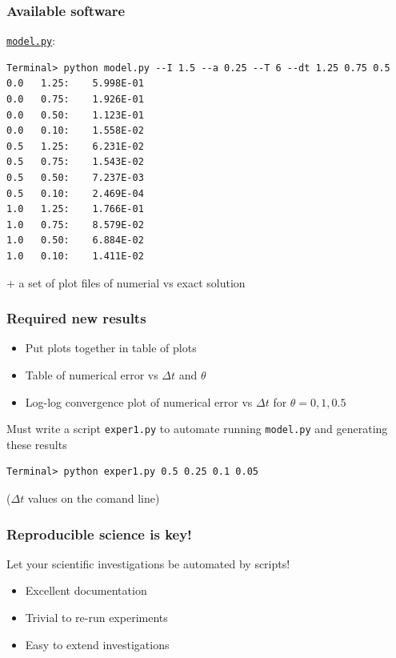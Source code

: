 \documentclass{beamer}
\newcounter{doconce:movie:counter}
\begin{document}
\begin{frame}
\frametitle{Available software}

\href{{http://tinyurl.com/nc4upel/doconce_src/model.py}}{\nolinkurl{model.py}}:

\begin{verbatim}
Terminal> python model.py --I 1.5 --a 0.25 --T 6 --dt 1.25 0.75 0.5
0.0   1.25:    5.998E-01
0.0   0.75:    1.926E-01
0.0   0.50:    1.123E-01
0.0   0.10:    1.558E-02
0.5   1.25:    6.231E-02
0.5   0.75:    1.543E-02
0.5   0.50:    7.237E-03
0.5   0.10:    2.469E-04
1.0   1.25:    1.766E-01
1.0   0.75:    8.579E-02
1.0   0.50:    6.884E-02
1.0   0.10:    1.411E-02
\end{verbatim}

+ a set of plot files of numerial vs exact solution
\end{frame}

\begin{frame}
\frametitle{Required new results}

\begin{itemize}
 \item Put plots together in table of plots

 \item Table of numerical error vs $\Delta t$ and $\theta$

 \item Log-log convergence plot of numerical error vs $\Delta t$ for $\theta=0,1,0.5$
\end{itemize}

\noindent
Must write a script \texttt{exper1.py} to automate running \texttt{model.py}
and generating these results

\begin{verbatim}
Terminal> python exper1.py 0.5 0.25 0.1 0.05
\end{verbatim}
($\Delta t$ values on the comand line)
\end{frame}

\begin{frame}
\frametitle{Reproducible science is key!}

Let your scientific investigations be automated by
scripts!

\begin{itemize}
 \item Excellent documentation

 \item Trivial to re-run experiments

 \item Easy to extend investigations
\end{itemize}

\noindent
\end{frame}
\end{document}
